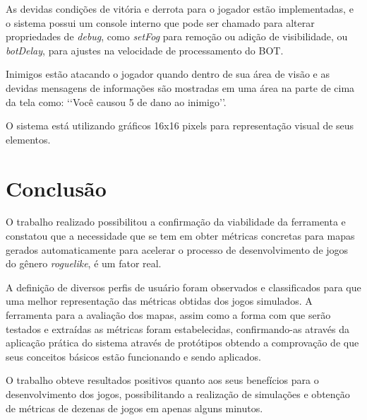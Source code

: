 	As devidas condições de vitória e derrota para o jogador estão implementadas, e o sistema possui um console interno que pode ser chamado para alterar propriedades de \textit{debug}, como \textit{setFog} para remoção ou adição de visibilidade, ou \textit{botDelay}, para ajustes na velocidade de processamento do BOT. 
	
	Inimigos estão atacando o jogador quando dentro de sua área de visão e as devidas mensagens de informações são mostradas em uma área na parte de cima da tela como: \lq\lq Você causou 5 de dano ao inimigo\rq\rq.
	
	O sistema está utilizando gráficos 16x16 pixels para representação visual de seus elementos. 
\section{Conclusão}
	O trabalho realizado possibilitou a confirmação da viabilidade da ferramenta e constatou que a necessidade que se tem em obter métricas concretas para mapas gerados automaticamente para acelerar o processo de desenvolvimento de jogos do gênero \textit{roguelike}, é um fator real.	
	
	A definição de diversos perfis de usuário foram observados e classificados para que uma melhor representação das métricas obtidas dos jogos simulados. 
	A ferramenta para a avaliação dos mapas, assim como a forma com que serão testados e extraídas as métricas foram estabelecidas, confirmando-as através da aplicação prática do sistema através de protótipos obtendo a comprovação de que seus conceitos básicos estão funcionando e sendo aplicados. 
	
	O trabalho obteve resultados positivos quanto aos seus benefícios para o desenvolvimento dos jogos, possibilitando a realização de simulações e obtenção de métricas de dezenas de jogos em apenas alguns minutos. 






\begin{comment}
\nocite{ArTerrainGen}
\nocite{Decipher}
\nocite{DesAudVid}
\nocite{DesAud}
\nocite{Noel}
\nocite{TaxonomySearchBasePCG}
\nocite{Voronoid}
\nocite{automaticDunGen}
\nocite{contest}
\nocite{pcgwiki}
\nocite{chunsoft}
\nocite{ArTerrainGen}
\nocite{izuna}
\nocite{depthsearch}
\nocite{Astar}
\nocite{normal}
\nocite{montgomery}
\end{comment}